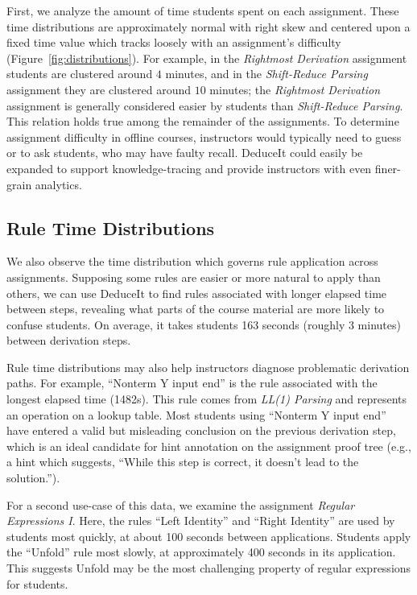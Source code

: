 \documentclass{sigchi}
\begin{document}
First, we analyze the amount of time students spent on each assignment. These time distributions are approximately normal with right skew and centered upon a fixed time value which tracks loosely with an assignment's difficulty (Figure~\ref{fig:distributions}). For example, in the \textit{Rightmost Derivation} assignment students are clustered around $4$ minutes, and in the \textit{Shift-Reduce Parsing} assignment they are clustered around $10$ minutes; the \textit{Rightmost Derivation} assignment is generally considered easier by students than \textit{Shift-Reduce Parsing}. This relation holds true among the remainder of the assignments. To determine assignment difficulty in offline courses, instructors would typically need to guess or to ask students, who may have faulty recall. DeduceIt could easily be expanded to support knowledge-tracing \cite{k-tracing} and provide instructors with even finer-grain analytics.

\subsection{Rule Time Distributions}

We also observe the time distribution which governs rule application across assignments. Supposing some rules are easier or more natural to apply than others, we can use DeduceIt to find rules associated with longer elapsed time between steps, revealing what parts of the course material are more likely to confuse students. On average, it takes students 163 seconds (roughly 3 minutes) between derivation steps. 

Rule time distributions may also help instructors diagnose problematic derivation paths. For example, ``Nonterm Y input end'' is the rule associated with the longest elapsed time (1482s). This rule comes from \textit{LL(1) Parsing} and represents an operation on a lookup table. Most students using ``Nonterm Y input end'' have entered a valid but misleading conclusion on the previous derivation step, which is an ideal candidate for hint annotation on the assignment proof tree (e.g., a hint which suggests, ``While this step is correct, it doesn't lead to the solution.''). %

For a second use-case of this data, we examine the assignment \textit{Regular Expressions I}. Here, the rules ``Left Identity'' and ``Right Identity'' are used by students most quickly, at about 100 seconds between applications. Students apply the ``Unfold'' rule most slowly, at approximately 400 seconds in its application. This suggests Unfold may be the most challenging property of regular expressions for students. 
\end{document}
